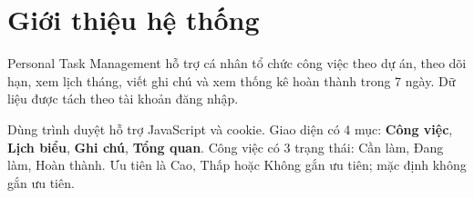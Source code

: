 \section{Giới thiệu hệ thống}

Personal Task Management hỗ trợ cá nhân tổ chức công việc theo dự án,
theo dõi hạn, xem lịch tháng, viết ghi chú và xem thống kê hoàn thành trong 7 ngày.
Dữ liệu được tách theo tài khoản đăng nhập.

Dùng trình duyệt hỗ trợ JavaScript và cookie. Giao diện có 4 mục:
\textbf{Công việc}, \textbf{Lịch biểu}, \textbf{Ghi chú}, \textbf{Tổng quan}.
Công việc có 3 trạng thái: Cần làm, Đang làm, Hoàn thành.
Ưu tiên là Cao, Thấp hoặc Không gắn ưu tiên; mặc định không gắn ưu tiên.
